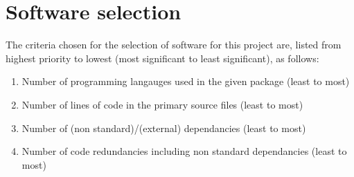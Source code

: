 \section{Software selection}\label{Software selection}

The criteria chosen for the selection of software for this project are, listed from highest priority to lowest (most significant to least significant), as follows:

\begin{enumerate}
    \item Number of programming langauges used in the given package (least to most)
    \item Number of lines of code in the primary source files (least to most)
    \item Number of (non standard)/(external) dependancies (least to most)
    \item Number of code redundancies including non standard dependancies (least to most)
\end{enumerate}